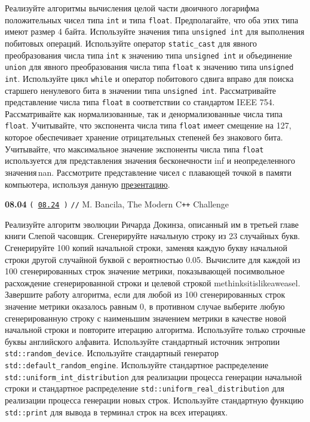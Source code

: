 \documentclass[a4paper,12pt]{article}
\begin{document}
\bigskip

Реализуйте алгоритмы вычисления целой части двоичного логарифма положительных чисел типа \lstinline{int} и типа \lstinline{float}. Предполагайте, что оба этих типа имеют размер 4 байта. Используйте значения типа \lstinline{unsigned int} для выполнения побитовых операций. Используйте оператор \lstinline{static_cast} для явного преобразования числа типа \lstinline{int} к значению типа \lstinline{unsigned int} и объединение \lstinline{union} для явного преобразования числа типа \lstinline{float} к значению типа \lstinline{unsigned int}. Используйте цикл \lstinline{while} и оператор побитового сдвига вправо для поиска старшего ненулевого бита в значении типа \lstinline{unsigned int}. Рассматривайте представление числа типа \lstinline{float} в соответствии со стандартом IEEE 754. Рассматривайте как нормализованные, так и денормализованные числа типа \lstinline{float}. Учитывайте, что экспонента числа типа \lstinline{float} имеет смещение на 127, которое обеспечивает хранение отрицательных степеней без знакового бита. Учитывайте, что максимальное значение экспоненты числа типа \lstinline{float} используется для представления значения бесконечности inf и неопределенного значения\,nan. Рассмотрите представление чисел с плавающей точкой в памяти компьютера, используя данную \href{https://cs357.cs.illinois.edu/textbook/assets/slides/94-Floating-Point.pdf}{презентацию}.

\bigskip

{\large \textbf{08.04} \texttt{(\,\href{https://github.com/i-s-m-mipt/Education/blob/master/projects/examples/source/08.24.cpp}{08.24}\,)} \texttt{//} M. Bancila, The Modern C\texttt{++} Challenge}

\bigskip

Реализуйте алгоритм эволюции Ричарда Докинза, описанный им в третьей главе книги Слепой часовщик. Сгенерируйте начальную строку из 23 случайных букв. Сгенерируйте 100 копий начальной строки, заменяя каждую букву начальной строки другой случайной буквой с вероятностью 0.05. Вычислите для каждой из 100 сгенерированных строк значение метрики, показывающей посимвольное расхождение сгенерированной строки и целевой строкой methinksitislikeaweasel. Завершите работу алгоритма, если для любой из 100 сгенерированных строк значение метрики оказалось равным 0, в противном случае выберите любую сгенерированную строку с наименьшим значением метрики в качестве новой начальной строки и повторите итерацию алгоритма. Используйте только строчные буквы английского алфавита. Используйте стандартный источник энтропии \lstinline{std::random_device}. Используйте стандартный генератор \lstinline{std::default_random_engine}. Используйте стандартное распределение \lstinline{std::uniform_int_distribution} для реализации процесса генерации начальной строки и стандартное распределение \lstinline{std::uniform_real_distribution} для реализации процесса генерации новых строк. Используйте стандартную функцию \lstinline{std::print} для вывода в терминал строк на всех итерациях.
\end{document}
